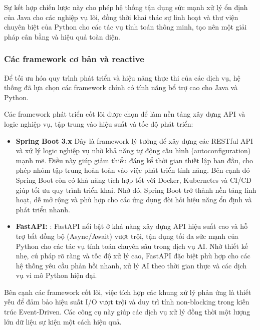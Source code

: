 Sự kết hợp chiến lược này cho phép hệ thống tận dụng sức mạnh xử lý ổn định của Java cho các nghiệp vụ lõi, đồng thời khai thác sự linh hoạt và thư viện chuyên biệt của Python cho các tác vụ tính toán thông minh, tạo nên một giải pháp cân bằng và hiệu quả toàn diện.

\subsubsection{Các framework cơ bản và reactive}

Để tối ưu hóa quy trình phát triển và hiệu năng thực thi của các dịch vụ, hệ thống đã lựa chọn các framework chính có tính năng bổ trợ cao cho Java và Python.

Các framework phát triển cốt lõi được chọn để làm nền tảng xây dựng API và logic nghiệp vụ, tập trung vào hiệu suất và tốc độ phát triển:

\begin{itemize}
    \item \textbf{Spring Boot 3.x\: } Đây là framework lý tưởng để xây dựng các RESTful API và xử lý logic nghiệp vụ nhờ khả năng tự động cấu hình (autoconfiguration) mạnh mẽ. Điều này giúp giảm thiểu đáng kể thời gian thiết lập ban đầu, cho phép nhóm tập trung hoàn toàn vào việc phát triển tính năng. Bên cạnh đó Spring Boot còn có khả năng tích hợp tốt với Docker, Kubernetes và CI/CD giúp tối ưu quy trình triển khai. Nhờ đó, Spring Boot trở thành nền tảng linh hoạt, dễ mở rộng và phù hợp cho các ứng dụng đòi hỏi hiệu năng ổn định và phát triển nhanh.
    \item \textbf{FastAPI: }: FastAPI nổi bật ở khả năng xây dựng API hiệu suất cao và hỗ trợ bất đồng bộ (Async/Await) vượt trội, tận dụng tối đa sức mạnh của Python cho các tác vụ tính toán chuyên sâu trong dịch vụ AI. Nhờ thiết kế nhẹ, cú pháp rõ ràng và tốc độ xử lý cao, FastAPI đặc biệt phù hợp cho các hệ thống yêu cầu phản hồi nhanh, xử lý AI theo thời gian thực và các dịch vụ vi mô Python hiện đại.
\end{itemize}

Bên cạnh các framework cốt lõi, việc tích hợp các khung xử lý phản ứng là thiết yếu để đảm bảo hiệu suất I/O vượt trội và duy trì tính non-blocking trong kiến trúc Event-Driven. Các công cụ này giúp các dịch vụ xử lý đồng thời một lượng lớn dữ liệu sự kiện một cách hiệu quả.

